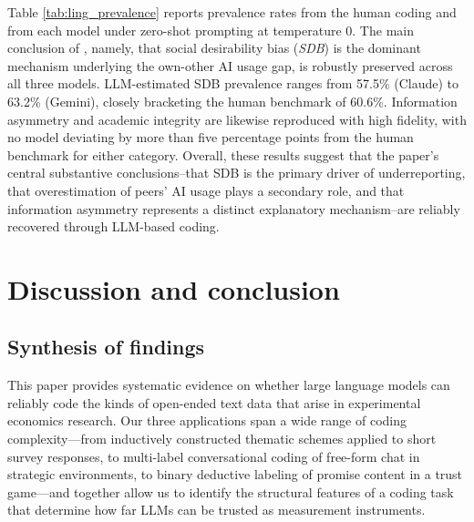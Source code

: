 \documentclass[11pt]{article}
\begin{document}
\begin{sloppypar}
Table \ref{tab:ling_prevalence} reports prevalence rates from the human coding and from each model under zero-shot prompting at temperature 0. The main conclusion of \citet{ling2025underreporting}, namely, that social desirability bias (\textit{SDB}) is the dominant mechanism underlying the own-other AI usage gap, is robustly preserved across all three models. LLM-estimated SDB prevalence ranges from 57.5\% (Claude) to 63.2\% (Gemini), closely bracketing the human benchmark of 60.6\%. Information asymmetry and academic integrity are likewise reproduced with high fidelity, with no model deviating by more than five percentage points from the human benchmark for either category. Overall, these results suggest that the paper’s central substantive conclusions--that SDB is the primary driver of underreporting, that overestimation of peers’ AI usage plays a secondary role, and that information asymmetry represents a distinct explanatory mechanism--are reliably recovered through LLM-based coding.



\section{Discussion and conclusion}\label{s-discussion}


\subsection*{Synthesis of findings}

This paper provides systematic evidence on whether large language models can reliably code the kinds of open-ended text data that arise in experimental economics research. Our three applications span a wide range of coding complexity---from inductively constructed thematic schemes applied to short survey responses, to multi-label conversational coding of free-form chat in strategic environments, to binary deductive labeling of promise content in a trust game---and together allow us to identify the structural features of a coding task that determine how far LLMs can be trusted as measurement instruments.


\end{sloppypar}
\end{document}
